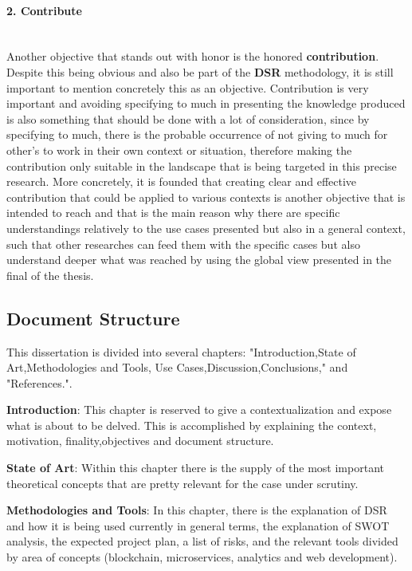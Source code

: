 \paragraph{2. Contribute}\mbox{}\\
Another objective that stands out with honor is the honored \textbf{contribution}. Despite this being obvious and also be part of the \textbf{DSR} methodology, it is still important to mention concretely this as an objective. Contribution is very important and avoiding specifying to much in presenting the knowledge produced is also something that should be done with a lot of consideration, since by specifying to much, there is the probable occurrence of not giving to much for other's to work in their own context or situation, therefore making the contribution only suitable in the landscape that is being targeted in this precise research. More concretely, it is founded that creating clear and effective contribution that could be applied to various contexts is another objective that is intended to reach and that is the main reason why there are specific understandings relatively to the use cases presented but also in a general context, such that other researches can feed them with the specific cases but also understand deeper what was reached by using the global view presented in the final of the thesis.

\subsection*{Document Structure}
This dissertation is divided into several chapters: "Introduction,State of Art,Methodologies and Tools, Use Cases,Discussion,Conclusions," and "References.".

\textbf {Introduction}: This chapter is reserved to give a contextualization and expose what is about to be delved. This is accomplished by explaining the context, motivation, finality,objectives and document structure.

\textbf{State of Art}: Within this chapter there is the supply of the most important theoretical concepts that are pretty relevant for the case under scrutiny.

\textbf{Methodologies and Tools}: In this chapter, there is the explanation of DSR and how it is being used currently in general terms, the explanation of SWOT analysis, the expected project plan, a list of risks, and the relevant tools divided by area of concepts (blockchain, microservices, analytics and web development).

